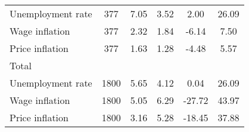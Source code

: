 \begin{table}[htbp]
\begin{tabular}{l*{1}{ccccc}}
Unemployment rate   &         377&        7.05&        3.52&        2.00&       26.09\\
Wage inflation      &         377&        2.32&        1.84&       -6.14&        7.50\\
Price inflation     &         377&        1.63&        1.28&       -4.48&        5.57\\
\hline
Total               &            &            &            &            &            \\
Unemployment rate   &        1800&        5.65&        4.12&        0.04&       26.09\\
Wage inflation      &        1800&        5.05&        6.29&      -27.72&       43.97\\
Price inflation     &        1800&        3.16&        5.28&      -18.45&       37.88\\
\hline\hline
\end{tabular}
\end{table}
